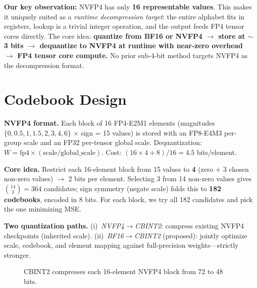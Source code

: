 \documentclass[11pt,a4paper]{article}
\begin{document}
\textbf{Our key observation:} NVFP4 has only \textbf{16 representable values}.
This makes it uniquely suited as a \emph{runtime decompression target}: the entire alphabet fits in registers, lookup is a trivial integer operation, and the output feeds FP4 tensor cores directly.
The core idea: \textbf{quantize from BF16 or NVFP4 $\to$ store at $\sim$3 bits $\to$ dequantize to NVFP4 at runtime with near-zero overhead $\to$ FP4 tensor core compute.}
No prior sub-4-bit method targets NVFP4 as the decompression format.

\section{Codebook Design}
\label{sec:method}

\textbf{NVFP4 format.}
Each block of 16 FP4-E2M1 elements (magnitudes $\{0, 0.5, 1, 1.5, 2, 3, 4, 6\}$ $\times$ sign = 15 values) is stored with an FP8-E4M3 per-group scale and an FP32 per-tensor global scale.
Dequantization: $W = \text{fp4} \times (\text{scale} / \text{global\_scale})$.
Cost: $(16 \times 4 + 8)/16 = 4.5$ bits/element.

\textbf{Core idea.}
Restrict each 16-element block from 15 values to \textbf{4} (zero $+$ 3 chosen non-zero values) $\to$ 2 bits per element.
Selecting 3 from 14 non-zero values gives $\binom{14}{3} = 364$ candidates; sign symmetry (negate scale) folds this to \textbf{182 codebooks}, encoded in 8 bits.
For each block, we try all 182 candidates and pick the one minimizing MSE.

\textbf{Two quantization paths.}
(i)~\emph{NVFP4$\to$CBINT2}: compress existing NVFP4 checkpoints (inherited scale).
(ii)~\emph{BF16$\to$CBINT2} (proposed): jointly optimize scale, codebook, and element mapping against full-precision weights---strictly stronger.

\begin{figure}[t]
\centering
{}
\caption{CBINT2 compresses each 16-element NVFP4 block from 72 to 48 bits.}
\label{fig:pipeline}
\end{figure}
\end{document}
